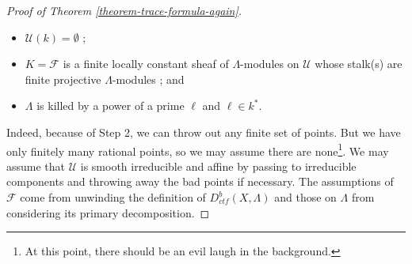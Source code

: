 \begin{proof}[Proof of Theorem \ref{theorem-trace-formula-again}]
\begin{enumerate}
{\begin{itemize}
\item $\mathcal{U}(k) = \emptyset$ ;
\item $K=\mathcal{F}$ is a finite locally constant sheaf of $\Lambda$-modules
on $\mathcal{U}$ whose stalk(s) are finite projective $\Lambda$-modules ; and
\item $\Lambda$ is killed by a power of a prime $\ell$ and $\ell \in k^*$.
\end{itemize}
}
\end{enumerate}
Indeed, because of Step 2, we can throw out any finite set of points. But we
have only finitely many rational points, so we may assume there are
none\footnote{At this point, there should be an evil laugh in the background.}.
We may assume that $\mathcal{U}$ is smooth irreducible and affine by passing to
irreducible components and throwing away the bad points if necessary. The
assumptions of $\mathcal{F}$ come from unwinding the definition of
$D_{ctf}^b(X, \Lambda)$ and those on $\Lambda$ from considering its primary
decomposition.


\end{proof}
